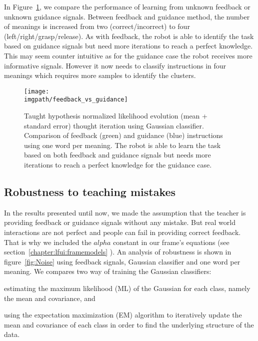In Figure~\ref{fig:Guidance}, we compare the performance of learning from unknown feedback or unknown guidance signals. Between feedback and guidance method, the number of meanings is increased from two (correct/incorrect) to four (left/right/grasp/release). As with feedback, the robot is able to identify the task based on guidance signals but need more iterations to reach a perfect knowledge. This may seem counter intuitive as for the guidance case the robot receives more informative signals. However it now needs to classify instructions in four meanings which requires more samples to identify the clusters. 

\begin{figure}[!htbp]
  \centering
  \texttt{[image: \\imgpath/feedback\_vs\_guidance]}
  \caption{Taught hypothesis normalized likelihood evolution (mean + standard error) thought iteration using Gaussian classifier. Comparison of feedback (green) and guidance (blue) instructions using one word per meaning. The robot is able to learn the task based on both feedback and guidance signals but needs more iterations to reach a perfect knowledge for the guidance case.}
  \label{fig:Guidance}
\end{figure}

\subsection{Robustness to teaching mistakes}

In the results presented until now, we made the assumption that the teacher is providing feedback or guidance signals without any mistake. But real world interactions are not perfect and people can fail in providing correct feedback. That is why we included the $alpha$ constant in our frame's equations (see section~\ref{chapter:lfui:framemodels}
). An analysis of robustness is shown in figure~\ref{fig:Noise} using feedback signals, Gaussian classifier and one word per meaning. We compares two way of training the Gaussian classifiers: \begin{inparaenum}[a)] \item estimating the maximum likelihood (ML) of the Gaussian for each class, namely the mean and covariance, and \item using the expectation maximization (EM) algorithm to iteratively update the mean and covariance of each class in order to find the underlying structure of the data. \end{inparaenum} 

